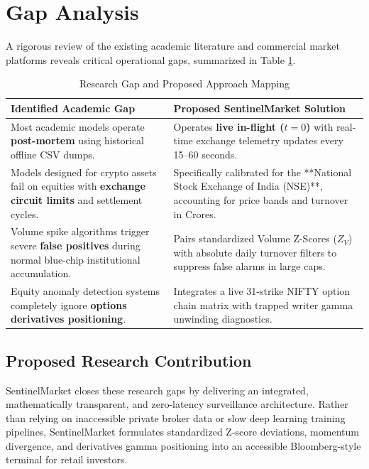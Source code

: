 \section{Gap Analysis}
A rigorous review of the existing academic literature and commercial market platforms reveals critical operational gaps, summarized in Table \ref{tab:gap_analysis}.

\begin{table}[H]
\centering
\caption{Research Gap and Proposed Approach Mapping}
\label{tab:gap_analysis}
\begin{tabularx}{\textwidth}{@{}p{4.5cm}X@{}}
\toprule
\textbf{Identified Academic Gap} & \textbf{Proposed SentinelMarket Solution} \\
\midrule
Most academic models operate \textbf{post-mortem} using historical offline CSV dumps. & Operates \textbf{live in-flight ($t=0$)} with real-time exchange telemetry updates every 15--60 seconds. \\
\addlinespace
Models designed for crypto assets fail on equities with \textbf{exchange circuit limits} and settlement cycles. & Specifically calibrated for the **National Stock Exchange of India (NSE)**, accounting for price bands and turnover in Crores. \\
\addlinespace
Volume spike algorithms trigger severe \textbf{false positives} during normal blue-chip institutional accumulation. & Pairs standardized Volume Z-Scores ($Z_V$) with absolute daily turnover filters to suppress false alarms in large caps. \\
\addlinespace
Equity anomaly detection systems completely ignore \textbf{options derivatives positioning}. & Integrates a live 31-strike NIFTY option chain matrix with trapped writer gamma unwinding diagnostics. \\
\bottomrule
\end{tabularx}
\end{table}

\subsection{Proposed Research Contribution}
SentinelMarket closes these research gaps by delivering an integrated, mathematically transparent, and zero-latency surveillance architecture. Rather than relying on inaccessible private broker data or slow deep learning training pipelines, SentinelMarket formulates standardized Z-score deviations, momentum divergence, and derivatives gamma positioning into an accessible Bloomberg-style terminal for retail investors.
